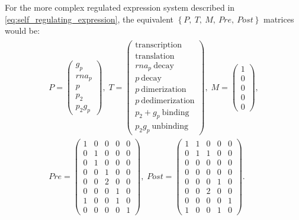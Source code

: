 For the more complex regulated expression system described in \eqref{eq:self_regulating_expression}, the equivalent $\left\{P,\ T,\ M,\ Pre,\ Post \right\}$ matrices would be:
\begin{gather}\label{eq:self_regulating_expression_matrices}
\begin{split}
    P = \left( \begin{array}{c}
        g_{p} \\
        rna_{p} \\
        p \\
        p_{2} \\
        p_{2}g_{p}
    \end{array} \right),\;
%
    T = \left( \begin{array}{c}
        \textrm{transcription} \\
        \textrm{translation} \\
        rna_p\ \textrm{decay} \\
        p\ \textrm{decay} \\
        p\ \textrm{dimerization} \\
        p\ \textrm{dedimerization} \\
        p_{2} + g_{p}\ \textrm{binding} \\
        p_{2}g_{p}\ \textrm{unbinding}
    \end{array} \right),\;
%
    M = \left( \begin{array}{c}
        1 \\
        0 \\
        0 \\
        0 \\
        0
    \end{array} \right),\\
%
    Pre = \left( \begin{array}{ccccc}
         1 &  0 &  0 &  0 &  0 \\
         0 &  1 &  0 &  0 &  0 \\
         0 &  1 &  0 &  0 &  0 \\
         0 &  0 &  1 &  0 &  0 \\
         0 &  0 &  2 &  0 &  0 \\
         0 &  0 &  0 &  1 &  0 \\
         1 &  0 &  0 &  1 &  0 \\
         0 &  0 &  0 &  0 &  1
    \end{array} \right),\;
%
    Post = \left( \begin{array}{ccccc}
         1 &  1 &  0 &  0 &  0 \\
         0 &  1 &  1 &  0 &  0 \\
         0 &  0 &  0 &  0 &  0 \\
         0 &  0 &  0 &  0 &  0 \\
         0 &  0 &  0 &  1 &  0 \\
         0 &  0 &  2 &  0 &  0 \\
         0 &  0 &  0 &  0 &  1 \\
         1 &  0 &  0 &  1 &  0
    \end{array} \right).\;
\end{split}
\end{gather}
